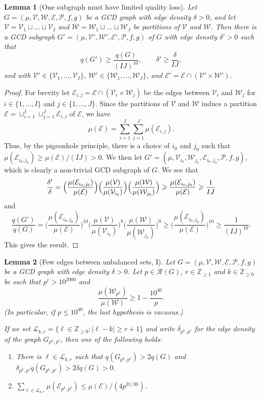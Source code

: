 \documentclass[12pt]{amsart}
\numberwithin{equation}{section}
\newtheorem{lem}{Lemma}[section]
\theoremstyle{definition}
\theoremstyle{remark}
\newcommand{\Z}{\mathbb{Z}}
\newcommand{\CE}{\mathcal{E}}
\newcommand{\CL}{\mathcal{L}}
\newcommand{\CP}{\mathcal{P}}
\newcommand{\CR}{\mathcal{R}}
\newcommand{\CV}{\mathcal{V}}
\newcommand{\CW}{\mathcal{W}}
\renewcommand{\le}{\leqslant}
\renewcommand{\ge}{\geqslant}
\begin{document}
\begin{lem}[One subgraph must have limited quality loss]\label{lem:Pigeonhole}
Let $G=(\mu,\CV,\CW,\CE,\CP,f,g)$ be a GCD graph with edge density $\delta>0$, and let $\CV=\CV_1\sqcup\dots \sqcup\CV_I$ and $\CW=\CW_1\sqcup\dots \sqcup\CW_J$ be partitions of $\CV$ and $\CW$. Then there is a GCD subgraph $G'=(\mu,\CV',\CW',\CE',\CP,f,g)$ of $G$ with edge density $\delta'>0$ such that
\[
q(G')\ge \frac{q(G)}{(I J)^{10}},\qquad \delta'\ge\frac{\delta}{I J},
\]
and with $\CV'\in\{\CV_1,\dots,\CV_I\}$, $\CW'\in\{\CW_1,\dots,\CW_J\}$, and $\CE'=\CE\cap(\CV'\times\CW')$.
\end{lem}
\begin{proof}
For brevity let $\CE_{i,j}=\CE\cap(\CV_i\times\CW_j)$ be the edges between $\CV_i$ and $\CW_j$ for $i\in\{1,\dots,I\}$ and $j\in \{1,\dots,J\}$. Since the partitions of $\CV$ and $\CW$ induce a partition $\CE=\sqcup_{i=1}^I\sqcup_{j=1}^{J}\CE_{i,j}$ of $\CE$, we have
\[
\mu(\CE)=\sum_{i=1}^I\sum_{j=1}^J \mu(\CE_{i,j}).
\]
Thus, by the pigeonhole principle, there is a choice of $i_0$ and $j_0$ such that $\mu(\CE_{i_0,j_0})\ge \mu(\CE)/(IJ)>0$. We then let $G'=(\mu,\CV_{i_0},\CW_{j_0},\CE_{i_0,j_0},\CP,f,g)$, which is clearly a non-trivial GCD subgraph of $G$. We see that
\[
\frac{\delta'}{\delta}=\Bigl(\frac{\mu(\CE_{i_0,j_0})}{\mu(\CE)}\Bigr)\Bigl(\frac {\mu(\CV)}{\mu(\CV_{i_0})}\Bigr)\Bigl(\frac{\mu(\CW)}{\mu(\CW_{j_0})}\Bigr)\ge \frac{\mu(\CE_{i_0,j_0})}{\mu(\CE)}\ge \frac{1}{I J}
\]
and
\[
\frac{q(G')}{q(G)}
	=\bigg(\frac{\mu(\CE_{i_0,j_0})}{\mu(\CE)}\bigg)^{10}
	 \bigg(\frac{\mu(\CV)}{\mu(\CV_{i_0})}\bigg)^{9}
	 \bigg(\frac{\mu(\CW)}{\mu(\CW_{j_0})}\bigg)^{9}
\ge 	\bigg(\frac{\mu(\CE_{i_0,j_0})}{\mu(\CE)}\bigg)^{10} \ge \frac{1}{(I J)^{10}}.
\]
This gives the result.
\end{proof}




\begin{lem}[Few edges between unbalanced sets, I]\label{lem:UnbalancedSetEdges1}
Let	$G=(\mu,\CV,\CW,\CE,\CP,f,g)$ be a GCD graph with edge density $\delta>0$. Let $p\in\CR(G)$, $r\in\Z_{\ge1}$ and $k\in\mathbb{Z}_{\ge 0}$ be such that $p^r>10^{2000}$ and
\[
\frac{\mu(\CW_{p^k})}{\mu(\CW)}\ge 1-\frac{10^{40}}{p}.
\]
(In particular, if $p\le 10^{40}$, the last hypothesis is vacuous.) 

If we set $\CL_{k,r}=\{\ell\in\Z_{\ge0}:|\ell-k|\ge r+1\}$ and write $\delta_{p^k,p^\ell}$ for the edge density of the graph $G_{p^k,p^\ell}$, then one of the following holds:
\begin{enumerate}
\item There is $\ell\in\CL_{k,r}$ such that $q(G_{p^k,p^\ell})>2q(G)$ and $\delta_{p^k,p^\ell}q(G_{p^k,p^\ell})>2\delta q(G)>0$.
\item $\sum_{\ell\in\CL_{k,r}}  \mu(\CE_{p^k,p^\ell})\le\mu(\CE)/(4p^{31/30})$.
\end{enumerate}
\end{lem}
\end{document}
